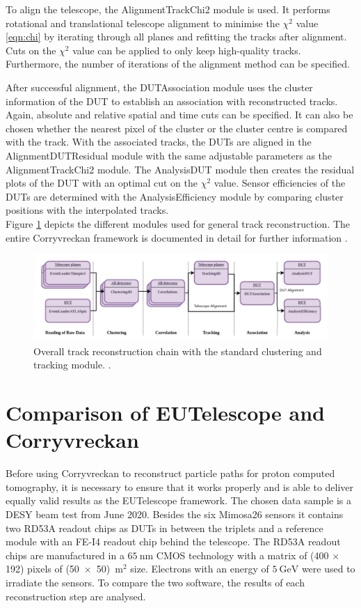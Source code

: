 To align the telescope, the AlignmentTrackChi2 module is used. It performs rotational and translational telescope
alignment to minimise the $\chi^2$ value \ref{eqn:chi} by iterating through all planes and refitting the tracks after alignment. Cuts on the $\chi^2$ value can be
applied to only keep high-quality tracks. Furthermore, the number of iterations of the alignment method can be specified.

After successful alignment, the DUTAssociation module uses the cluster information of the DUT to establish an association with reconstructed tracks. Again, absolute
and relative spatial and time cuts can be specified. It can also be chosen whether the nearest pixel of the cluster or the cluster centre is compared with the track.
With the associated tracks, the DUTs are aligned in the AlignmentDUTResidual module with the same adjustable parameters as the AlignmentTrackChi2 module.
The AnalysisDUT module then creates the residual plots of the DUT with an optimal cut on the $\chi^2$ value. Sensor efficiencies of the DUTs are determined with the
AnalysisEfficiency module by comparing cluster positions with the interpolated tracks. \\
Figure \ref{fig:corry_track_reco} depicts
the different modules used for general track reconstruction. The entire Corryvreckan framework is documented in detail for further information \cite{corry_manual}.

\begin{figure}
  \centering
  \includegraphics[height=0.3\textwidth]{images/corry.png}
  \caption{Overall track reconstruction chain with the standard clustering and tracking module. \cite{corry_track_reco}.}
  \label{fig:corry_track_reco}
\end{figure}

\chapter{Comparison of EUTelescope and Corryvreckan}\label{make}
Before using Corryvreckan to reconstruct particle paths for proton computed tomography, it is necessary to ensure that it works properly
and is able to deliver equally valid results as the EUTelescope framework.
The chosen data sample is a DESY beam test from June 2020. Besides the six Mimosa26 sensors it contains two RD53A readout chips
as DUTs in between the triplets and a reference module with an FE-I4 readout chip behind the telescope. The RD53A readout chips are
manufactured in a $\SI{65}{\nano\meter}$ CMOS technology with a matrix of (400 $\times$ 192) pixels of
\mbox{(50 $\times$ 50) \textmu m$^2$} size. Electrons with an energy of $\SI{5}{\GeV}$ were used to irradiate the sensors.
To compare the two software, the results of each
reconstruction step are analysed. \\

